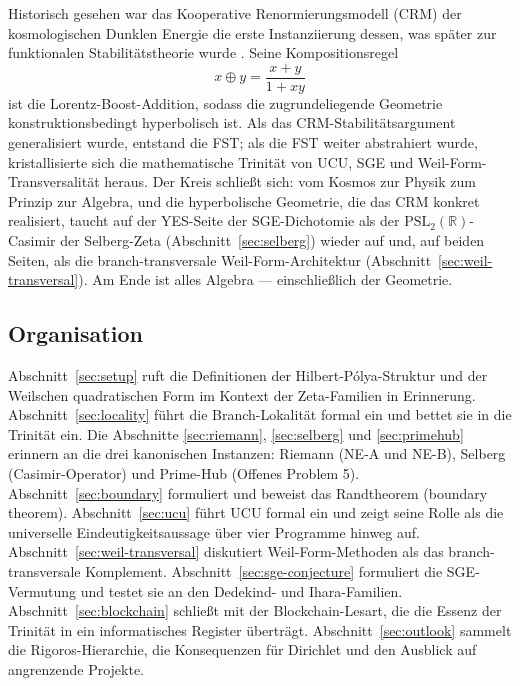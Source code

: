 \documentclass[11pt]{article}
\theoremstyle{definition}
\theoremstyle{remark}
\newcommand{\PSL}{\mathrm{PSL}}
\begin{document}
Historisch gesehen war das Kooperative Renormierungsmodell (CRM) der
kosmologischen Dunklen Energie die erste Instanziierung dessen, was später zur
funktionalen Stabilitätstheorie wurde \cite{RFEPFramework}. Seine
Kompositionsregel
\[
  x \oplus y = \frac{x + y}{1 + xy}
\]
ist die Lorentz-Boost-Addition, sodass die zugrundeliegende Geometrie
konstruktionsbedingt hyperbolisch ist. Als das CRM-Stabilitätsargument
generalisiert wurde, entstand die FST; als die FST weiter abstrahiert wurde,
kristallisierte sich die mathematische Trinität von UCU, SGE und Weil-Form-Transversalität
heraus. Der Kreis schließt sich: vom Kosmos zur Physik zum Prinzip zur Algebra,
und die hyperbolische Geometrie, die das CRM konkret realisiert,
taucht auf der YES-Seite der SGE-Dichotomie als der $\PSL_2(\mathbb{R})$-Casimir
der Selberg-Zeta (Abschnitt~\ref{sec:selberg}) wieder auf und, auf beiden Seiten,
als die branch-transversale Weil-Form-Architektur (Abschnitt~\ref{sec:weil-transversal}).
Am Ende ist alles Algebra --- einschließlich der Geometrie.

\subsection{Organisation}
\label{sec:intro-organization}

Abschnitt~\ref{sec:setup} ruft die Definitionen der Hilbert-P\'olya-Struktur und
der Weilschen quadratischen Form im Kontext der Zeta-Familien in Erinnerung.
Abschnitt~\ref{sec:locality} führt die Branch-Lokalität formal ein und bettet sie
in die Trinität ein. Die Abschnitte \ref{sec:riemann}, \ref{sec:selberg} und \ref{sec:primehub}
erinnern an die drei kanonischen Instanzen: Riemann (NE-A und NE-B), Selberg
(Casimir-Operator) und Prime-Hub (Offenes Problem 5).
Abschnitt~\ref{sec:boundary} formuliert und beweist das Randtheorem (boundary theorem).
Abschnitt~\ref{sec:ucu} führt UCU formal ein und zeigt seine
Rolle als die universelle Eindeutigkeitsaussage über vier Programme hinweg auf.
Abschnitt~\ref{sec:weil-transversal} diskutiert Weil-Form-Methoden als das
branch-transversale Komplement. Abschnitt~\ref{sec:sge-conjecture}
formuliert die SGE-Vermutung und testet sie an den Dedekind- und
Ihara-Familien. Abschnitt~\ref{sec:blockchain} schließt mit der
Blockchain-Lesart, die die Essenz der Trinität in ein informatisches Register
überträgt. Abschnitt~\ref{sec:outlook} sammelt die Rigoros-Hierarchie, die Konsequenzen
für Dirichlet und den Ausblick auf angrenzende Projekte.

\end{document}
